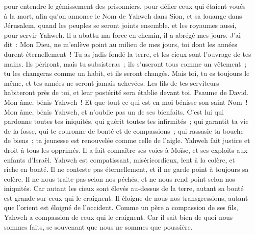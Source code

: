 \begin{multicols}{2}
pour entendre le gémissement des prisonniers, pour délier ceux qui étaient voués à la mort,
afin qu'on annonce le Nom de Yahweh dans Sion, et sa louange dans Jérusalem,
quand les peuples se seront joints ensemble, et les royaumes aussi, pour servir Yahweh.
Il a abattu ma force en chemin, il a abrégé mes jours.
J'ai dit~: Mon Dieu, ne m'enlève point au milieu de mes jours, toi dont les années durent éternellement~!
Tu as jadis fondé la terre, et les cieux sont l'ouvrage de tes mains.
Ils périront, mais tu subsisteras~; ils s'useront tous comme un vêtement~; tu les changeras comme un habit, et ils seront changés.
Mais toi, tu es toujours le même, et tes années ne seront jamais achevées.
Les fils de tes serviteurs habiteront près de toi, et leur postérité sera établie devant toi.
\VerseOne{}Psaume de David. Mon âme, bénis Yahweh~! Et que tout ce qui est en moi bénisse son saint Nom~!
Mon âme, bénis Yahweh, et n'oublie pas un de ses bienfaits.
C'est lui qui pardonne toutes tes iniquités, qui guérit toutes tes infirmités~;
qui garantit ta vie de la fosse, qui te couronne de bonté et de compassions~;
qui rassasie ta bouche de biens~; ta jeunesse est renouvelée comme celle de l'aigle.
Yahweh fait justice et droit à tous les opprimés.
Il a fait connaître ses voies à Moïse, et ses exploits aux enfants d'Israël.
Yahweh est compatissant, miséricordieux, lent à la colère, et riche en bonté.
Il ne conteste pas éternellement, et il ne garde point à toujours sa colère.
Il ne nous traite pas selon nos péchés, et ne nous rend point selon nos iniquités.
Car autant les cieux sont élevés au-dessus de la terre, autant sa bonté est grande sur ceux qui le craignent.
Il éloigne de nous nos transgressions, autant que l'orient est éloigné de l'occident.
Comme un père a compassion de ses fils, Yahweh a compassion de ceux qui le craignent.
Car il sait bien de quoi nous sommes faits, se souvenant que nous ne sommes que poussière.

\end{multicols}
